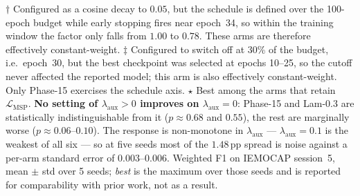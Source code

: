 \begin{table}[t]
\vspace{2pt}
\footnotesize
$\dagger$ Configured as a cosine decay to $0.05$, but the schedule is defined
over the 100-epoch budget while early stopping fires near epoch~34, so within
the training window the factor only falls from $1.00$ to $0.78$. These arms are
therefore effectively constant-weight.
$\ddagger$ Configured to switch off at 30\% of the budget, i.e.\ epoch~30, but
the best checkpoint was selected at epochs 10--25, so the cutoff never affected
the reported model; this arm is also effectively constant-weight. Only Phase-15
exercises the schedule axis.
$\star$ Best among the arms that retain $\mathcal{L}_{\text{MSP}}$.
\textbf{No setting of $\lambda_{\text{aux}}>0$ improves on
$\lambda_{\text{aux}}=0$}: Phase-15 and Lam-0.3 are statistically
indistinguishable from it ($p\approx0.68$ and $0.55$), the rest are marginally
worse ($p\approx0.06$--$0.10$). The response is non-monotone in
$\lambda_{\text{aux}}$ --- $\lambda_{\text{aux}}{=}0.1$ is the weakest of all
six --- so at five seeds most of the $1.48$\,pp spread is noise against a
per-arm standard error of $0.003$--$0.006$. Weighted F1 on IEMOCAP session~5,
mean $\pm$ std over 5 seeds; \emph{best} is the maximum over those seeds and is
reported for comparability with prior work, not as a result.
\end{table}

